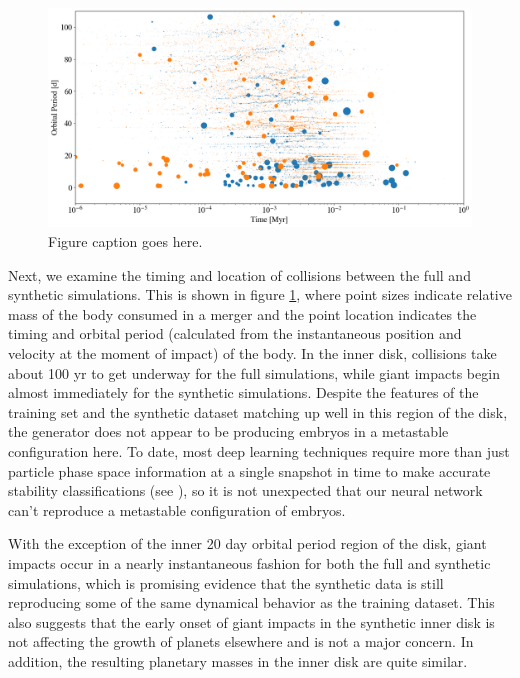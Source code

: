 \begin{figure}
\begin{center}
    \includegraphics[width=\textwidth]{figures/stip/full_coll_syn_comp.png}
    \caption{Figure caption goes here.\label{fig:full_coll_syn_comp}}
\end{center}
\end{figure}

Next, we examine the timing and location of collisions between the full and synthetic simulations. This is shown in figure \ref{fig:full_coll_syn_comp}, where point sizes indicate relative mass of the body consumed in a merger and the point location indicates the timing and orbital period (calculated from the instantaneous position and velocity at the moment of impact) of the body. In the inner disk, collisions take about 100 yr to get underway for the full simulations, while giant impacts begin almost immediately for the synthetic simulations. Despite the features of the training set and the synthetic dataset matching up well in this region of the disk, the generator does not appear to be producing embryos in a metastable configuration here. To date, most deep learning techniques require more than just particle phase space information at a single snapshot in time to make accurate stability classifications (see \cite{tamayo20, cranmer21}), so it is not unexpected that our neural network can't reproduce a metastable configuration of embryos.

With the exception of the inner 20 day orbital period region of the disk, giant impacts occur in a nearly instantaneous fashion for both the full and synthetic simulations, which is promising evidence that the synthetic data is still reproducing some of the same dynamical behavior as the training dataset. This also suggests that the early onset of giant impacts in the synthetic inner disk is not affecting the growth of planets elsewhere and is not a major concern. In addition, the resulting planetary masses in the inner disk are quite similar.

